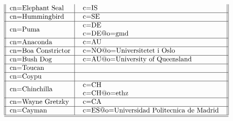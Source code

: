 \begin{table}
\[\begin{tabular}{||l|l||}
cn=Elephant Seal
           &\begin{tabular}{l}
           c=IS \\
           \end{tabular}\\ \hline
cn=Hummingbird
           &\begin{tabular}{l}
           c=SE \\
           \end{tabular}\\ \hline
cn=Puma
           &\begin{tabular}{l}
           c=DE \\
           c=DE@o=gmd \\
           \end{tabular}\\ \hline
cn=Anaconda
           &\begin{tabular}{l}
           c=AU \\
           \end{tabular}\\ \hline
cn=Boa Constrictor
           &\begin{tabular}{l}
	   c=NO@o=Universitetet i Oslo \\
           \end{tabular}\\ \hline
cn=Bush Dog
           &\begin{tabular}{l}
           c=AU@o=University of Queensland \\
           \end{tabular}\\ \hline
cn=Toucan
           &\begin{tabular}{l}
           \end{tabular}\\ \hline
cn=Coypu
           &\begin{tabular}{l}
           \end{tabular}\\ \hline
cn=Chinchilla
           &\begin{tabular}{l}
           c=CH \\
           c=CH@o=ethz \\
           \end{tabular}\\ \hline
cn=Wayne Gretzky
           &\begin{tabular}{l}
           c=CA \\
           \end{tabular}\\ \hline
cn=Cayman
           &\begin{tabular}{l}
	   c=ES@o=Universidad Politecnica de Madrid \\
           \end{tabular}\\ \hline
\hline
\end{tabular}
\]
\end{table}

